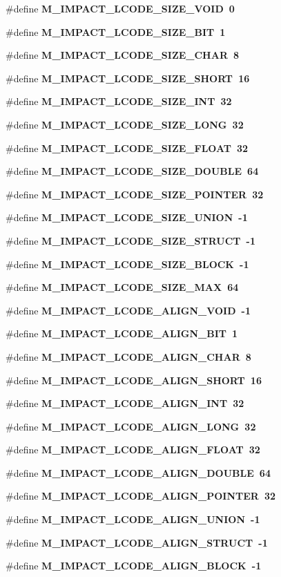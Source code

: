 \begin{CompactItemize}
\item 
\#define \bf{M\_\-IMPACT\_\-LCODE\_\-SIZE\_\-VOID}~0
\item 
\#define \bf{M\_\-IMPACT\_\-LCODE\_\-SIZE\_\-BIT}~1
\item 
\#define \bf{M\_\-IMPACT\_\-LCODE\_\-SIZE\_\-CHAR}~8
\item 
\#define \bf{M\_\-IMPACT\_\-LCODE\_\-SIZE\_\-SHORT}~16
\item 
\#define \bf{M\_\-IMPACT\_\-LCODE\_\-SIZE\_\-INT}~32
\item 
\#define \bf{M\_\-IMPACT\_\-LCODE\_\-SIZE\_\-LONG}~32
\item 
\#define \bf{M\_\-IMPACT\_\-LCODE\_\-SIZE\_\-FLOAT}~32
\item 
\#define \bf{M\_\-IMPACT\_\-LCODE\_\-SIZE\_\-DOUBLE}~64
\item 
\#define \bf{M\_\-IMPACT\_\-LCODE\_\-SIZE\_\-POINTER}~32
\item 
\#define \bf{M\_\-IMPACT\_\-LCODE\_\-SIZE\_\-UNION}~-1
\item 
\#define \bf{M\_\-IMPACT\_\-LCODE\_\-SIZE\_\-STRUCT}~-1
\item 
\#define \bf{M\_\-IMPACT\_\-LCODE\_\-SIZE\_\-BLOCK}~-1
\item 
\#define \bf{M\_\-IMPACT\_\-LCODE\_\-SIZE\_\-MAX}~64
\item 
\#define \bf{M\_\-IMPACT\_\-LCODE\_\-ALIGN\_\-VOID}~-1
\item 
\#define \bf{M\_\-IMPACT\_\-LCODE\_\-ALIGN\_\-BIT}~1
\item 
\#define \bf{M\_\-IMPACT\_\-LCODE\_\-ALIGN\_\-CHAR}~8
\item 
\#define \bf{M\_\-IMPACT\_\-LCODE\_\-ALIGN\_\-SHORT}~16
\item 
\#define \bf{M\_\-IMPACT\_\-LCODE\_\-ALIGN\_\-INT}~32
\item 
\#define \bf{M\_\-IMPACT\_\-LCODE\_\-ALIGN\_\-LONG}~32
\item 
\#define \bf{M\_\-IMPACT\_\-LCODE\_\-ALIGN\_\-FLOAT}~32
\item 
\#define \bf{M\_\-IMPACT\_\-LCODE\_\-ALIGN\_\-DOUBLE}~64
\item 
\#define \bf{M\_\-IMPACT\_\-LCODE\_\-ALIGN\_\-POINTER}~32
\item 
\#define \bf{M\_\-IMPACT\_\-LCODE\_\-ALIGN\_\-UNION}~-1
\item 
\#define \bf{M\_\-IMPACT\_\-LCODE\_\-ALIGN\_\-STRUCT}~-1
\item 
\#define \bf{M\_\-IMPACT\_\-LCODE\_\-ALIGN\_\-BLOCK}~-1

\end{CompactItemize}
